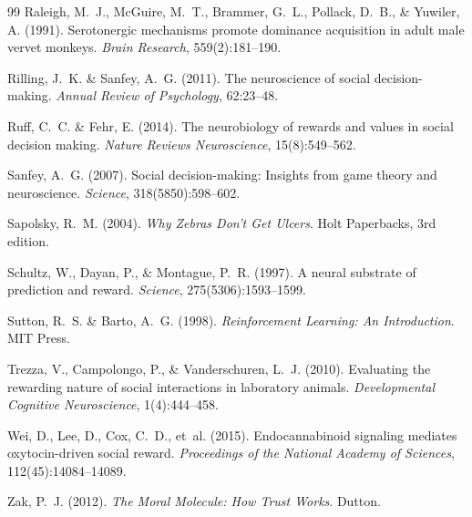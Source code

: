 \documentclass[11pt,a4paper]{article}
\begin{document}
\begin{thebibliography}{99}
Raleigh, M.~J., McGuire, M.~T., Brammer, G.~L., Pollack, D.~B., \& Yuwiler, A. (1991).
\newblock Serotonergic mechanisms promote dominance acquisition in adult male vervet monkeys.
\newblock \emph{Brain Research}, 559(2):181--190.

Rilling, J.~K. \& Sanfey, A.~G. (2011).
\newblock The neuroscience of social decision-making.
\newblock \emph{Annual Review of Psychology}, 62:23--48.

Ruff, C.~C. \& Fehr, E. (2014).
\newblock The neurobiology of rewards and values in social decision making.
\newblock \emph{Nature Reviews Neuroscience}, 15(8):549--562.

Sanfey, A.~G. (2007).
\newblock Social decision-making: Insights from game theory and neuroscience.
\newblock \emph{Science}, 318(5850):598--602.

Sapolsky, R.~M. (2004).
\newblock \emph{Why Zebras Don't Get Ulcers}.
\newblock Holt Paperbacks, 3rd edition.

Schultz, W., Dayan, P., \& Montague, P.~R. (1997).
\newblock A neural substrate of prediction and reward.
\newblock \emph{Science}, 275(5306):1593--1599.

Sutton, R.~S. \& Barto, A.~G. (1998).
\newblock \emph{Reinforcement Learning: An Introduction}.
\newblock MIT Press.

Trezza, V., Campolongo, P., \& Vanderschuren, L.~J. (2010).
\newblock Evaluating the rewarding nature of social interactions in laboratory animals.
\newblock \emph{Developmental Cognitive Neuroscience}, 1(4):444--458.

Wei, D., Lee, D., Cox, C.~D., et~al. (2015).
\newblock Endocannabinoid signaling mediates oxytocin-driven social reward.
\newblock \emph{Proceedings of the National Academy of Sciences}, 112(45):14084--14089.

Zak, P.~J. (2012).
\newblock \emph{The Moral Molecule: How Trust Works}.
\newblock Dutton.

\end{thebibliography}
\end{document}
